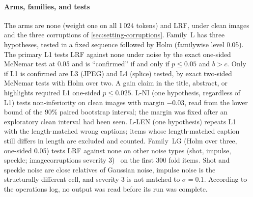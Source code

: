 \paragraph*{Arms, families, and tests}
The arms are none (weight one on all 1\,024 tokens) and LRF, under clean images and the three corruptions of
\cref{sec:setting-corruptions}.
Family~L has three hypotheses, tested in a fixed sequence followed by Holm (familywise level 0.05).
The primary L1 tests LRF against none under noise by the exact one-sided McNemar test at 0.05 and is ``confirmed'' if and only if
$p\le0.05$ and $b>c$.
Only if L1 is confirmed are L3 (JPEG) and L4 (splice) tested, by exact two-sided McNemar tests with Holm over two.
A gain claim in the title, abstract, or highlights required L1 one-sided $p\le0.025$.
L-NI (one hypothesis, regardless of L1) tests non-inferiority on clean images with margin $-0.03$, read from the lower bound of the 90\%
paired bootstrap interval; the margin was fixed after an exploratory clean interval had been seen.
L-LEN (one hypothesis) repeats L1 with the length-matched wrong captions; items whose length-matched caption still differs in length are
excluded and counted.
Family~LG (Holm over three, one-sided 0.05) tests LRF against none on other noise types (shot, impulse, speckle; imagecorruptions severity
3)~\cite{michaelis2019imagecorruptions} on the first 300 fold items.
Shot and speckle noise are close relatives of Gaussian noise, impulse noise is the structurally different cell, and severity 3 is not
matched to $\sigma=0.1$.
According to the operations log, no output was read before its run was complete.

